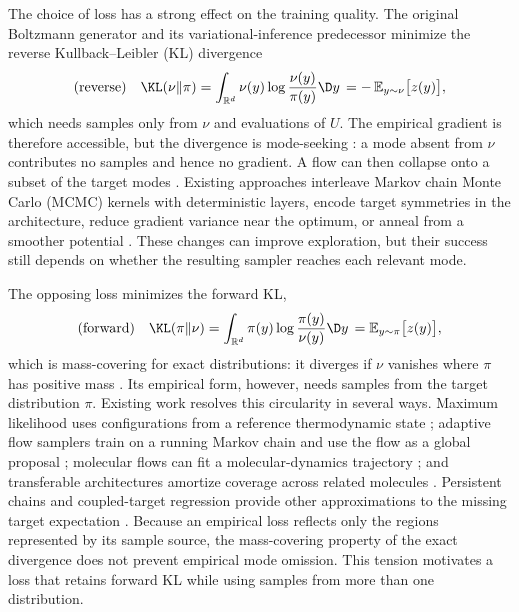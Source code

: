 \documentclass{article}
\begin{document}
The choice of loss has a strong effect on the training quality. The original Boltzmann generator \citep{noe2019boltzmann} and its variational-inference predecessor \citep{rezende2015variational} minimize the reverse Kullback--Leibler (KL) divergence
\begin{equation}
    \text{(reverse)}\quad \KL(\nu\|\pi) = \int_{\mathbb R^d} \nu(y) \log \frac{\nu(y)}{\pi(y)} \D y \,= -\,\mathbb E_{y\sim\nu}\bigl[z(y)\bigr],
    \label{eq: reverse KL}
\end{equation}
which needs samples only from $\nu$ and evaluations of $U$. The empirical gradient is therefore accessible, but the divergence is mode-seeking \citep{wainwright2008graphical}: a mode absent from $\nu$ contributes no samples and hence no gradient. A flow can then collapse onto a subset of the target modes \citep{wu2020stochastic,felardos2023designing}. Existing approaches interleave Markov chain Monte Carlo (MCMC) kernels with deterministic layers, encode target symmetries in the architecture, reduce gradient variance near the optimum, or anneal from a smoother potential \citep{wu2020stochastic,kohler2020equivariant,vaitl2022gradients,schopmans2025temperature}. These changes can improve exploration, but their success still depends on whether the resulting sampler reaches each relevant mode.

The opposing loss minimizes the forward KL,
\begin{equation}
    \text{(forward)}\quad \KL(\pi\|\nu) = \int_{\mathbb R^d} \pi(y) \log \frac{\pi(y)}{\nu(y)} \D y \,= \mathbb E_{y\sim\pi}\bigl[z(y)\bigr],
    \label{eq: forward KL}
\end{equation}
which is mass-covering for exact distributions: it diverges if $\nu$ vanishes where $\pi$ has positive mass \citep{wainwright2008graphical}. Its empirical form, however, needs samples from the target distribution $\pi$. Existing work resolves this circularity in several ways. Maximum likelihood uses configurations from a reference thermodynamic state \citep{wirnsberger2020targeted}; adaptive flow samplers train on a running Markov chain and use the flow as a global proposal \citep{gabrie2022adaptive}; molecular flows can fit a molecular-dynamics trajectory \citep{klein2023equivariant}; and transferable architectures amortize coverage across related molecules \citep{klein2024transferable}. Persistent chains and coupled-target regression provide other approximations to the missing target expectation \citep{naesseth2020markovian,rehman2026regflow}. Because an empirical loss reflects only the regions represented by its sample source, the mass-covering property of the exact divergence does not prevent empirical mode omission. This tension motivates a loss that retains forward KL while using samples from more than one distribution.
\end{document}
